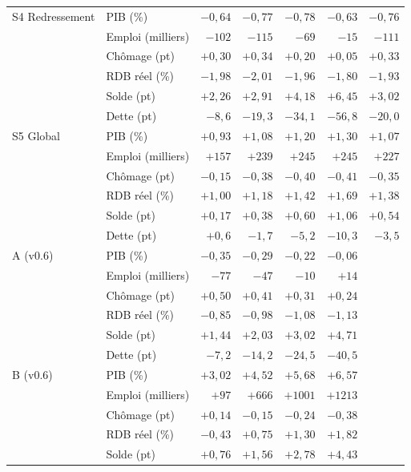 \begin{longtable}{llrrrrr}
\addlinespace
S4 Redressement & PIB (\%) & $-0{,}64$ & $-0{,}77$ & $-0{,}78$ & $-0{,}63$ & $-0{,}76$\\
 & Emploi (milliers) & $-102$ & $-115$ & $-69$ & $-15$ & $-111$\\
 & Chômage (pt) & $+0{,}30$ & $+0{,}34$ & $+0{,}20$ & $+0{,}05$ & $+0{,}33$\\
 & RDB réel (\%) & $-1{,}98$ & $-2{,}01$ & $-1{,}96$ & $-1{,}80$ & $-1{,}93$\\
 & Solde (pt) & $+2{,}26$ & $+2{,}91$ & $+4{,}18$ & $+6{,}45$ & $+3{,}02$\\
 & Dette (pt) & $-8{,}6$ & $-19{,}3$ & $-34{,}1$ & $-56{,}8$ & $-20{,}0$\\
\addlinespace
S5 Global & PIB (\%) & $+0{,}93$ & $+1{,}08$ & $+1{,}20$ & $+1{,}30$ & $+1{,}07$\\
 & Emploi (milliers) & $+157$ & $+239$ & $+245$ & $+245$ & $+227$\\
 & Chômage (pt) & $-0{,}15$ & $-0{,}38$ & $-0{,}40$ & $-0{,}41$ & $-0{,}35$\\
 & RDB réel (\%) & $+1{,}00$ & $+1{,}18$ & $+1{,}42$ & $+1{,}69$ & $+1{,}38$\\
 & Solde (pt) & $+0{,}17$ & $+0{,}38$ & $+0{,}60$ & $+1{,}06$ & $+0{,}54$\\
 & Dette (pt) & $+0{,}6$ & $-1{,}7$ & $-5{,}2$ & $-10{,}3$ & $-3{,}5$\\
\addlinespace
A (v0.6) & PIB (\%) & $-0{,}35$ & $-0{,}29$ & $-0{,}22$ & $-0{,}06$ & \\
 & Emploi (milliers) & $-77$ & $-47$ & $-10$ & $+14$ & \\
 & Chômage (pt) & $+0{,}50$ & $+0{,}41$ & $+0{,}31$ & $+0{,}24$ & \\
 & RDB réel (\%) & $-0{,}85$ & $-0{,}98$ & $-1{,}08$ & $-1{,}13$ & \\
 & Solde (pt) & $+1{,}44$ & $+2{,}03$ & $+3{,}02$ & $+4{,}71$ & \\
 & Dette (pt) & $-7{,}2$ & $-14{,}2$ & $-24{,}5$ & $-40{,}5$ & \\
\addlinespace
B (v0.6) & PIB (\%) & $+3{,}02$ & $+4{,}52$ & $+5{,}68$ & $+6{,}57$ & \\
 & Emploi (milliers) & $+97$ & $+666$ & $+1001$ & $+1213$ & \\
 & Chômage (pt) & $+0{,}14$ & $-0{,}15$ & $-0{,}24$ & $-0{,}38$ & \\
 & RDB réel (\%) & $-0{,}43$ & $+0{,}75$ & $+1{,}30$ & $+1{,}82$ & \\
 & Solde (pt) & $+0{,}76$ & $+1{,}56$ & $+2{,}78$ & $+4{,}43$ & \\

\end{longtable}

